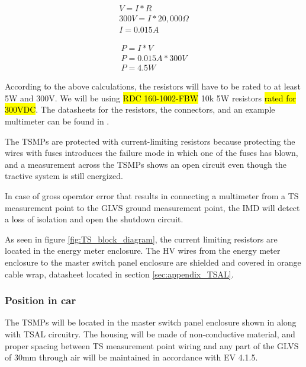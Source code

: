 \documentclass{article}
\begin{document}
\begin{align*}
V = I * R \\
300V = I * 20,000\Omega \\
I = 0.015A
\end{align*}

\begin{align*}
P = I * V \\
P = 0.015A * 300V \\
P = 4.5W
\end{align*}

According to the above calculations, the resistors will have to be rated to at least 5W and 300V. We will be using \hl{RDC 160-1002-FBW} 10k 5W resistors \hl{rated for 300VDC}. The datasheets for the resistors, the connectors, and an example multimeter can be found in .

The TSMPs are protected with current-limiting resistors because protecting the wires with fuses introduces the failure mode in which one of the fuses has blown, and a measurement across the TSMPs shows an open circuit even though the tractive system is still energized. 

In case of gross operator error that results in connecting a multimeter from a TS measurement point to the GLVS ground measurement point, the IMD will detect a loss of isolation and open the shutdown circuit. 

As seen in figure \ref{fig:TS_block_diagram}, the current limiting resistors are located in the energy meter enclosure. The HV wires from the energy meter enclosure to the master switch panel enclosure are shielded and covered in orange cable wrap, datasheet located in section \ref{sec:appendix_TSAL}.

\subsubsection{Position in car}
The TSMPs will be located in the master switch panel enclosure shown in  along with TSAL circuitry. The housing will be made of non-conductive material, and proper spacing between TS measurement point wiring and any part of the GLVS of 30mm through air will be maintained in accordance with EV 4.1.5.
\end{document}

